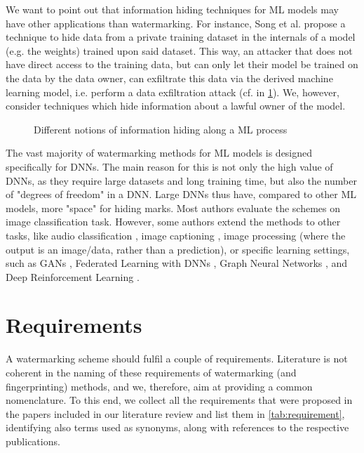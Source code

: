 We want to point out that information hiding techniques for ML models may have other applications than watermarking. For instance, Song et al. \cite{song_machine_2017} propose a technique to hide data from a private training dataset in the internals of a model (e.g. the weights) trained upon said dataset. 
This way, an attacker that does not have direct access to the training data, but can only let their model be trained on the data by the data owner, can exfiltrate this data via the derived machine learning model, i.e. perform a data exfiltration attack  (cf.  in \cref{fig:watermarking-ml-process}).
We, however, consider techniques which hide information about a lawful owner of the model. 
\begin{figure}
\centering
    
    \caption{Different notions of information hiding along a ML process}
    \label{fig:watermarking-ml-process}
\end{figure}

The vast majority of watermarking methods for ML models is designed specifically for DNNs. The main reason for this is not only the high value of DNNs, as they require large datasets and long training time, but also the number of "degrees of freedom" in a DNN. Large DNNs thus have, compared to other ML models, more "space" for hiding marks. 
Most authors evaluate the schemes on image classification task. However, some authors extend the methods to other tasks, like audio classification \cite{jia_entangled_2020}, image captioning \cite{lim_protect_2020}, image processing \cite{quan_watermarking_2020, wu_watermarking_2020, zhang_model_2020} (where the output is an image/data, rather than a prediction), or specific learning settings, such as GANs \cite{skripniuk_black-box_2020}, Federated Learning with DNNs \cite{atli_waffle_2020},
Graph Neural Networks \cite{zhao_watermarking_2020}, and Deep Reinforcement Learning \cite{behzadan_sequential_2019}.

\section{Requirements} \label{sec:requirements}
A watermarking scheme should fulfil a couple of requirements. Literature is not coherent in the naming of these requirements of watermarking (and fingerprinting) methods, and we, therefore, aim at providing a common nomenclature. 
To this end, we collect all the requirements that were proposed in the papers included in our literature review and list them in \cref{tab:requirement}, identifying also terms used as synonyms, along with references to the respective publications.

